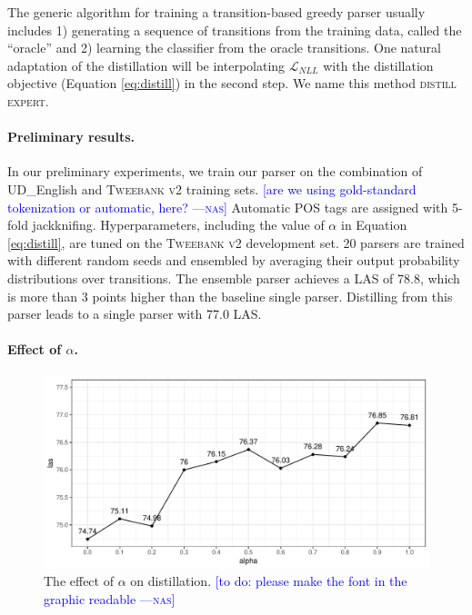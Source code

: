 \documentclass[11pt,a4paper]{article}
\newcommand{\nascomment}[1]{\textcolor{blue}{[#1 ---\textsc{nas}]}}
\begin{document}
The generic algorithm for training a transition-based greedy parser
usually includes 1) generating a sequence of transitions from the 
training data, called the ``oracle'' and 2) learning the classifier from
the oracle transitions. One natural adaptation of the distillation will be interpolating
$\mathcal{L}_{\mathit{NLL}}$ with the distillation objective (Equation \ref{eq:distill})
in the second step. We name this method \textsc{distill expert}. 

\paragraph{Preliminary results.}
In our preliminary experiments, we train our parser on the combination of UD\_English
and \textsc{Tweebank v2} training sets. \nascomment{are we using
  gold-standard tokenization or automatic, here?} Automatic POS tags are assigned with 5-fold
jackknifing. Hyperparameters, including the value of $\alpha$ in Equation \ref{eq:distill},
are tuned on the \textsc{Tweebank v2} development set. 20 parsers are trained with
different random seeds and ensembled by averaging their output probability
distributions over transitions. The ensemble parser achieves a LAS of 78.8, which is more 
than 3 points higher than the baseline single parser. Distilling from this
parser leads to a single parser with  77.0 LAS.

\paragraph{Effect of $\alpha$.}

\begin{figure}[t]
	\centering
	\includegraphics[width=\columnwidth]{graphics/alpha}
	\caption{The effect of $\alpha$ on
          distillation. \nascomment{to do:  please make the font in
            the graphic readable}}\label{fig:effect-alpha}
\end{figure}
\end{document}
